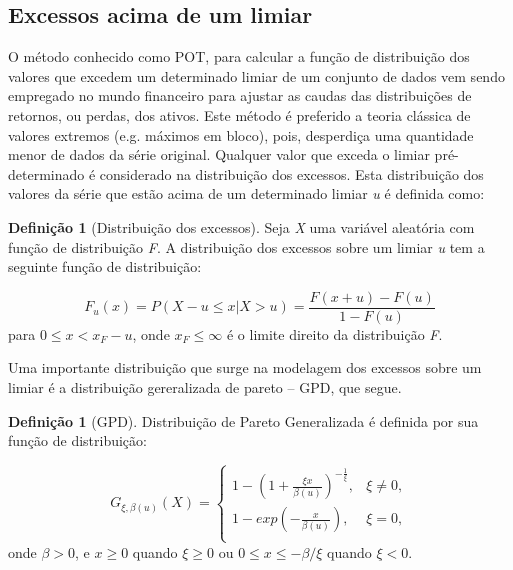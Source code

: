 \documentclass[review]{elsarticle}
\theoremstyle{definition}
\newtheorem{defi}[teor]{Definição}
\begin{document}
\subsection{Excessos acima de um limiar}
\label{sec:excess}

O método conhecido como POT, para calcular a função de distribuição dos valores que excedem um determinado limiar de um conjunto de dados vem sendo empregado no mundo financeiro para ajustar as caudas das distribuições de retornos, ou perdas, dos ativos. Este método é preferido a teoria clássica de valores extremos (e.g. máximos em bloco), pois, desperdiça uma quantidade menor de dados da série original. Qualquer valor que exceda o limiar pré-determinado é considerado na distribuição dos excessos. Esta distribuição dos valores da série que estão acima de um determinado limiar \emph{u} é definida como:

\begin{defi}[Distribuição dos excessos] \label{defi:excess}
	Seja \emph{X} uma variável aleatória com função de distribuição \emph{F}. A distribuição dos excessos sobre um limiar \emph{u} tem a seguinte função de distribuição:
\end{defi}

\begin{equation}
\label{eq:excessdist}
F_u(x)=P(X-u \leq x | X > u)=\frac{F(x+u)-F(u)}{1-F(u)}
\end{equation}
para $0 \leq x < x_F-u$, onde $x_F \leq \infty$ é o limite direito da distribuição \emph{F}.

Uma importante distribuição que surge na modelagem dos excessos sobre um limiar é a distribuição gereralizada de pareto – GPD, que segue.

\begin{defi}[GPD] \label{defi:GPD}
	Distribuição de Pareto Generalizada é definida por sua função de distribuição:
\end{defi}

\begin{equation}
\label{eq:GPD}
G_{\xi,\beta(u)}(X) = 
\begin{cases}
1- \left(1+ \frac{\xi x}{\beta(u)} \right)^{-\frac{1}{\xi}}, & \xi \neq 0,\\
1-exp\left(-\frac{x}{\beta(u)}\right), & \xi = 0,\\
\end{cases}
\end{equation}
onde $\beta > 0$, e $x\geq 0$ quando $\xi  \geq 0$ ou $0 \leq x \leq -\beta / \xi$ quando $\xi < 0$.
\end{document}
